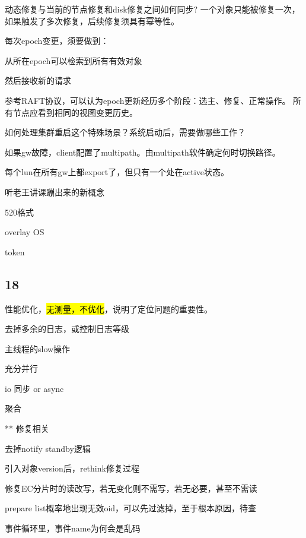 动态修复与当前的节点修复和disk修复之间如何同步? 一个对象只能被修复一次，如果触发了多次修复，后续修复须具有幂等性。

每次epoch变更，须要做到：
\begin{enumbox}
\item 从所在epoch可以检索到所有有效对象
\item 然后接收新的请求
\end{enumbox}

参考RAFT协议，可以认为epoch更新经历多个阶段：选主、修复、正常操作。
所有节点应看到相同的视图变更历史。

如何处理集群重启这个特殊场景？系统启动后，需要做哪些工作？

\hrulefill

如果gw故障，client配置了multipath。由multipath软件确定何时切换路径。

每个lun在所有gw上都export了，但只有一个处在active状态。

\hrulefill

听老王讲课蹦出来的新概念
\begin{enumbox}
\item 520格式
\item overlay OS
\item token
\end{enumbox}

\subsection{18}

性能优化，\hl{无测量，不优化}，说明了定位问题的重要性。
\begin{enumbox}
\item 去掉多余的日志，或控制日志等级
\item 主线程的slow操作
\item 充分并行
\item io 同步 or async
\item 聚合
\item *** 修复相关
\item 去掉notify standby逻辑
\item 引入对象version后，rethink修复过程
\item 修复EC分片时的读改写，若无变化则不需写，若无必要，甚至不需读
\item prepare list概率地出现无效oid，可以先过滤掉，至于根本原因，待查
\item 事件循环里，事件name为何会是乱码
\end{enumbox}

